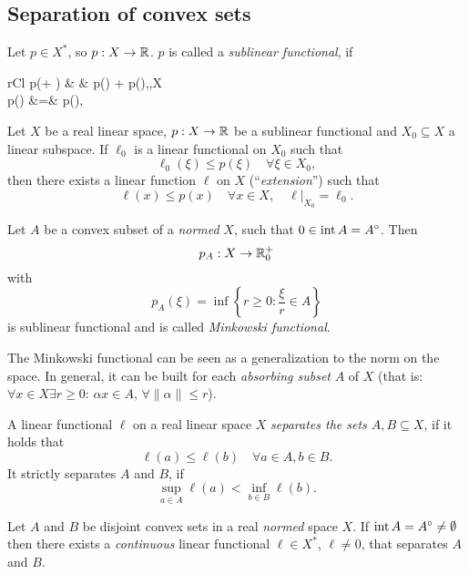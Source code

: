 \documentclass[../skript.tex]{subfiles}
\begin{document}
\subsection*{Separation of convex sets}
\begin{remarknonumb}
	Let $p\in X^*$, so $p:X\to\mathbb{R}$. $p$ is called a \emph{sublinear functional}, if
	\begin{IEEEeqnarray*}{rCl}
		p(\xi + \eta) & \leq & p(\xi) + p(\eta),\quad  \forall \xi,\eta\in X\\
		p(\alpha\xi) &=& \alpha p(\xi), \quad {}\alpha {} 
	\end{IEEEeqnarray*}
\end{remarknonumb}
\begin{theoremnonumb} %
Let $X$ be a real linear space, $p : X \to \mathbb{R}$ be a sublinear functional and $X_0\subseteq X$ a linear subspace. If $\ell_0$ is a linear functional on $X_0$ such that 
\[
	\ell_0(\xi) \leq p(\xi) \quad \forall \xi \in X_0,
\]
then there exists a linear function $\ell$ on $X$ (``\emph{extension}'') such that
\[
	\ell(x) \leq p(x) \quad \forall x \in X, \quad \ell|_{X_0} = \ell_0.
\]
\end{theoremnonumb}
\begin{definitionnonumb} %
Let $A$ be a convex subset of a \emph{normed} $X$, such that $0 \in \operatorname{int} A = A^\circ$. Then
\[
	p_A:X\to \mathbb{R}_0^+
\]
with 
\[
	p_A(\xi) = \inf \left\{ r \geq 0 : \frac{\xi}{r} \in A \right\}
\]
is sublinear functional and is called \emph{Minkowski functional}.
\end{definitionnonumb}
\begin{remarknonumb}
	The Minkowski functional can be seen as a generalization to the norm on the space. In general, it can be built for each \emph{absorbing subset} $A$ of $X$ (that is: $\forall x\in X\exists r\geq 0:\,\alpha x\in A,\,\forall\|\alpha\|\leq r$).
\end{remarknonumb}
\begin{definition} %
\label{def:c1e6}
A linear functional $\ell$ on a real linear space $X$ \emph{separates the sets $A, B \subseteq X$}, if it holds that
\[
	\ell(a) \leq \ell(b) \quad \forall a \in A, b \in B.
\]
It strictly separates $A$ and $B$, if
\[
	\sup_{a \in A} \ell(a) < \inf_{b \in B} \ell(b).
\]
\end{definition}
\begin{theorem} %
\label{thm:c1e7}
Let $A$ and $B$ be disjoint convex sets in a real \emph{normed} space $X$. If $\operatorname{int} A = A^\circ \neq \emptyset$ then there exists a \emph{continuous} linear functional $\ell \in X^*$, $\ell \neq 0$, that separates $A$ and $B$.
\end{theorem}
\end{document}

